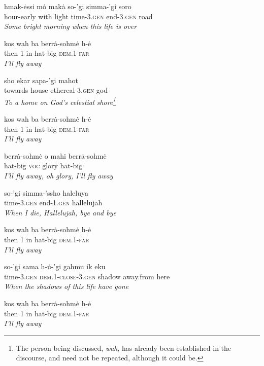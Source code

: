 \documentclass{article}[10pt]
\begin{document}
\begin{exe}

\ex
\gll hmak-\.{e}ssi m\.{o} mak\.{a} so-'gi simma-'gi soro\\
hour-early with light time-\textsc{3.gen} end-\textsc{3.gen} road\\
\trans \emph{Some bright morning when this life is over}

\ex
\gll kos wah ba berr\.{a}-sohm\.{e} h-\.{e}\\
then 1 in hat-big \textsc{dem.1}-\textsc{far}\\
\trans \emph{I'll fly away}

\ex
\gll sho ekar sapa-'gi mahot\\
towards house ethereal-\textsc{3.gen} god\\
\trans \emph{To a home on God's celestial shore\emph{\footnote{The person being discussed, \emph{wah}, has already been established in the discourse, and need not be repeated, although it could be.}}}

\ex
\gll kos wah ba berr\.{a}-sohm\.{e} h-\.{e}\\
then 1 in hat-big \textsc{dem.1}-\textsc{far}\\
\trans \emph{I'll fly away}

\ex
\gll berr\.{a}-sohm\.{e} o mahi berr\.{a}-sohm\.{e}\\
hat-big \textsc{voc} glory hat-big\\
\trans \emph{I'll fly away, oh glory, I'll fly away}

\ex
\gll so-'gi simma-'ssho haleluya\\
time-\textsc{3.gen} end-\textsc{1.gen} hallelujah\\
\trans \emph{When I die, Hallelujah, bye and bye}

\ex
\gll kos wah ba berr\.{a}-sohm\.{e} h-\.{e}\\
then 1 in hat-big \textsc{dem.1}-\textsc{far}\\
\trans \emph{I'll fly away}

\ex
\gll so-'gi sama h-\.{u}-'gi gahmu \'{i}k eku\\
time-\textsc{3.gen} \textsc{dem.1}-\textsc{close}-\textsc{3.gen} shadow away.from here \\
\trans \emph{When the shadows of this life have gone}

\ex
\gll kos wah ba berr\.{a}-sohm\.{e} h-\.{e}\\
then 1 in hat-big \textsc{dem.1}-\textsc{far}\\
\trans \emph{I'll fly away}


\end{exe}
\end{document}

